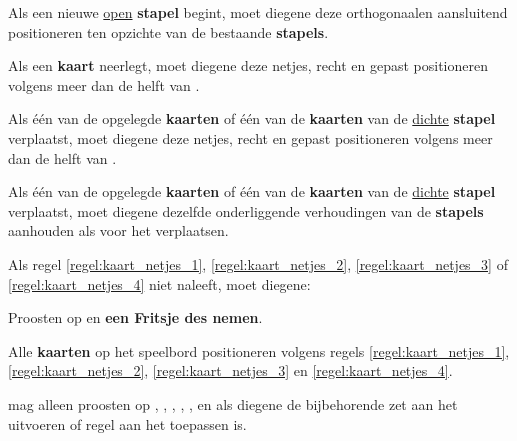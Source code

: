 
\vervolgLijst{}
\item Als \eenSpeler een nieuwe \ul{open} \textbf{stapel} begint, moet diegene deze orthogonaal\footnotemark[2] en aansluitend positioneren ten opzichte van de bestaande \textbf{stapels}.
\label{regel:kaart_netjes_1}
\eindLijst{}

\vervolgLijst{}
\item Als \eenSpeler een \textbf{kaart} neerlegt, moet diegene deze netjes, recht en gepast positioneren volgens meer dan de helft van \alleSpelersN.
\label{regel:kaart_netjes_2}
\eindLijst{}

\vervolgLijst{}
\item Als \eenSpeler één van de opgelegde \textbf{kaarten} of één van de \textbf{kaarten} van de \ul{dichte} \textbf{stapel} verplaatst, moet diegene deze netjes, recht en gepast positioneren volgens meer dan de helft van \alleSpelersN.
\label{regel:kaart_netjes_3}
\eindLijst{}

\vervolgLijst{}
\item Als \eenSpeler één van de opgelegde \textbf{kaarten} of één van de \textbf{kaarten} van de \ul{dichte} \textbf{stapel} verplaatst, moet diegene dezelfde onderliggende verhoudingen van de \textbf{stapels} aanhouden als voor het verplaatsen.
\label{regel:kaart_netjes_4}
\eindLijst{}

\vervolgLijst{}
\item Als \eenSpeler regel \ref{regel:kaart_netjes_1}, \ref{regel:kaart_netjes_2}, \ref{regel:kaart_netjes_3} of \ref{regel:kaart_netjes_4} niet naleeft, moet diegene:
\puntLijst{}
\item Proosten op  en \textbf{een Fritsje des nemen}\footnotemark[3].
\item Alle \textbf{kaarten} op het speelbord positioneren volgens regels \ref{regel:kaart_netjes_1}, \ref{regel:kaart_netjes_2}, \ref{regel:kaart_netjes_3} en \ref{regel:kaart_netjes_4}.
\eindPuntLijst{}
\eindLijst{}


\vervolgLijst{}
\item \EenSpeler mag alleen proosten op , , , , ,  en  als diegene de bijbehorende zet aan het uitvoeren of regel aan het toepassen is\footnotemark[4].
\eindLijst{}

